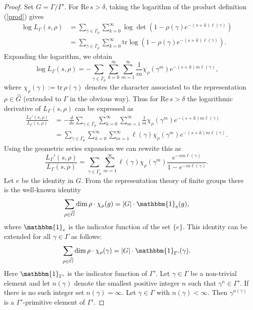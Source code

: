 \documentclass[12pt]{article}
\newcommand{\R}{\mathrm{Re}\,}
\newcommand{\tr}{\mathrm{tr}}
\begin{document}
\begin{proof}
Set $ G = \Gamma/\Gamma' $. For $ \R s > \delta $, taking the logarithm of the product definition (\ref{prod}) gives 
\begin{align*}
\log L_{\Gamma}(s,\rho) &= \sum_{\overline{\gamma}\in \overline{\Gamma}_{p}} \sum_{k=0}^{\infty} \log \det\left( 1-\rho(\gamma)e^{-(s+k)\ell(\gamma)}\right)\\
 &= \sum_{\overline{\gamma}\in \overline{\Gamma}_{p}} \sum_{k=0}^{\infty} \tr \log \left( 1-\rho(\gamma)e^{-(s+k)\ell(\gamma)}\right).
\end{align*}
Expanding the logarithm, we obtain
$$ \log L_{\Gamma}(s,\rho) = -\sum_{\overline{\gamma}\in \overline{\Gamma}_{p}} \sum_{k=0}^{\infty} \sum_{m=1}^{\infty} \frac{1}{m}\chi_{\rho}(\gamma^{m})e^{-(s+k)m\ell(\gamma)}, $$
where $ \chi_{\rho}(\gamma) := \tr\, \rho(\gamma) $ denotes the character associated to the representation $ \rho\in \widehat{G} $ (extended to $ \Gamma $ in the obvious way). 
Thus for $ \R s > \delta $ the logarithmic derivative of $ L_{\Gamma}(s,\rho) $ can be expressed as
\begin{align*}
\frac{L_{\Gamma}'(s,\rho)}{L_{\Gamma}(s,\rho)} &= - \frac{d}{ds} \sum_{\overline{\gamma}\in \overline{\Gamma}_{p}} \sum_{k=0}^{\infty} \sum_{m=1}^{\infty} \frac{1}{m}\chi_{\rho}(\gamma^{m})e^{-(s+k)m\ell(\gamma)}\\
&= \sum_{\overline{\gamma}\in \overline{\Gamma}_{p}} \sum_{k=0}^{\infty}  \sum_{m=1}^{\infty} \ell(\gamma)\chi_{\rho}(\gamma^{m})e^{-(s+k)m\ell(\gamma)}.
\end{align*}
Using the geometric series expansion we can rewrite this as
\begin{equation}\label{logder}
\frac{L_{\Gamma}'(s,\rho)}{L_{\Gamma}(s,\rho)}=\sum_{\overline{\gamma}\in \overline{\Gamma}_{p}}\sum_{m=1}^{\infty} \ell(\gamma) \chi_{\rho}(\gamma^{m}) \frac{e^{-sm\ell(\gamma)}}{1-e^{-m\ell(\gamma)}}.
\end{equation}
Let $ e $ be the identity in $ G $. From the representation theory of finite groups there is the well-known identity
$$ \sum_{\rho\in \widehat{G}} \dim \rho\cdot \chi_{\rho}(g) = \vert G\vert \cdot \mathbbm{1}_{e}(g),
$$
where $ \mathbbm{1}_{e} $ is the indicator function of the set $ \{ e\} $. This identity can be extended for all $ \gamma\in \Gamma $ as follows:
\begin{equation}\label{Identity}
\sum_{\rho\in \widehat{G}} \dim \rho\cdot \chi_{\rho}(\gamma) = \vert G\vert \cdot \mathbbm{1}_{\Gamma'}(\gamma).
\end{equation}
Here $ \mathbbm{1}_{\Gamma'} $ is the indicator function of $ \Gamma' $. Let $ \gamma\in \Gamma $ be a non-trivial element and let $ n(\gamma) $ denote the smallest positive integer $ n $ such that $ \gamma^{n}\in \Gamma' $. If there is no such integer set $ n(\gamma) = \infty. $ Let $ \gamma\in \Gamma $ with $ n(\gamma)<\infty $. Then $ \gamma^{n(\gamma)} $ is a $ \Gamma' $-primitive element of $ \Gamma' $. 


\end{proof}
\end{document}
